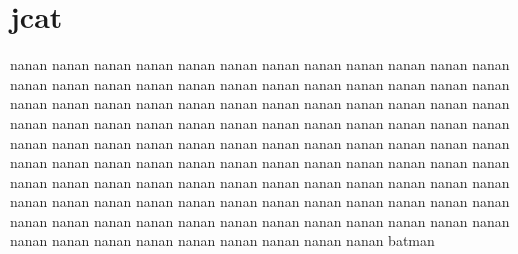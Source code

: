 \documentclass[11pt,a4paper]{report}
\begin{document}
\section{jcat}

nanan nanan nanan nanan nanan nanan nanan nanan nanan nanan nanan nanan nanan
nanan nanan nanan nanan nanan nanan nanan nanan nanan nanan nanan nanan nanan
nanan nanan nanan nanan nanan nanan nanan nanan nanan nanan nanan nanan nanan
nanan nanan nanan nanan nanan nanan nanan nanan nanan nanan nanan nanan nanan
nanan nanan nanan nanan nanan nanan nanan nanan nanan nanan nanan nanan nanan
nanan nanan nanan nanan nanan nanan nanan nanan nanan nanan nanan nanan nanan
nanan nanan nanan nanan nanan nanan nanan nanan nanan nanan nanan nanan nanan
nanan nanan nanan nanan nanan nanan nanan nanan nanan nanan nanan nanan nanan
nanan nanan nanan nanan nanan nanan nanan nanan nanan nanan nanan nanan nanan
batman

\newpage
\null
\thispagestyle{empty}
\newpage
\end{document}
